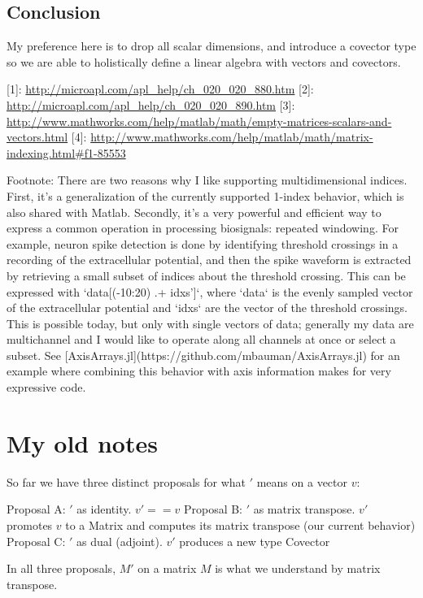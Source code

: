 \subsection{Conclusion}

My preference here is to drop all scalar dimensions, and introduce a covector
type so we are able to holistically define a linear algebra with vectors and
covectors.



[1]: \url{http://microapl.com/apl_help/ch_020_020_880.htm}
[2]: \url{http://microapl.com/apl_help/ch_020_020_890.htm}
[3]: \url{http://www.mathworks.com/help/matlab/math/empty-matrices-scalars-and-vectors.html}
[4]: \url{http://www.mathworks.com/help/matlab/math/matrix-indexing.html#f1-85553}

Footnote: There are two reasons why I like supporting multidimensional
indices. First, it's a generalization of the currently supported 1-index
behavior, which is also shared with Matlab. Secondly, it's a very powerful and
efficient way to express a common operation in processing biosignals: repeated
windowing. For example, neuron spike detection is done by identifying threshold
crossings in a recording of the extracellular potential, and then the spike
waveform is extracted by retrieving a small subset of indices about the
threshold crossing. This can be expressed with `data[(-10:20) .+ idxs']`, where
`data` is the evenly sampled vector of the extracellular potential and `idxs`
are the vector of the threshold crossings. This is possible today, but only
with single vectors of data; generally my data are multichannel and I would
like to operate along all channels at once or select a subset. See
[AxisArrays.jl](https://github.com/mbauman/AxisArrays.jl) for an example where
combining this behavior with axis information makes for very expressive code.



\section{My old notes}

So far we have three distinct proposals for what $'$ means on a vector $v$:

Proposal A: $'$ as identity. $v' == v$
Proposal B: $'$ as matrix transpose. $v'$ promotes $v$ to a Matrix and computes its matrix transpose (our current behavior)
Proposal C: $'$ as dual (adjoint). $v'$ produces a new type Covector

In all three proposals, $M'$ on a matrix $M$ is what we understand by matrix transpose.

